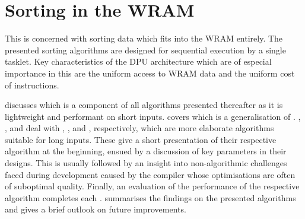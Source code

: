 \chapter[Sorting in the \texorpdfstring{\abb{WRAM}}{WRAM}]{Sorting in the \acs*{WRAM}}
\label{sec:tasklet}

This  is concerned with sorting data which fits into the \ac{WRAM} entirely.
The presented sorting algorithms are designed for sequential execution by a single tasklet.
Key characteristics of the \ac{DPU} architecture which are of especial importance in this  are the uniform access to \ac{WRAM} data and the uniform cost of instructions.

 discusses \IS{} which is a component of all algorithms presented thereafter as it is lightweight and performant on short inputs.
 covers \ShS{} which is a generalisation of \IS{}.
\hyperref[sec:tasklet:heap]{ }, , and  deal with \HS{}, \QS{}, and \MS{}, respectively, which are more elaborate algorithms suitable for long inputs.
These  give a short presentation of their respective algorithm at the beginning, ensued by a discussion of key parameters in their designs.
This is usually followed by an insight into non-algorithmic challenges faced during development caused by the compiler whose optimisations are often of suboptimal quality.
Finally, an evaluation of the performance of the respective algorithm completes each .
 summarises the findings on the presented algorithms and gives a brief outlook on future improvements.

